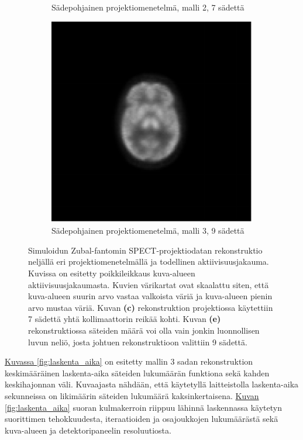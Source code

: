 \begin{figure}[H]
\begin{subfigure}[b]{.25\textwidth}
        \caption{Sädepohjainen projektiomenetelmä, malli 2, 7 sädettä}
    \end{subfigure}%
    \hspace{.075\textwidth}%
    \begin{subfigure}[b]{.25\textwidth}
        \includegraphics[width=\linewidth]{kuvat/cbf_rekonstruktio_proj1_malli3_nRay9.pdf}
        \caption{Sädepohjainen projektiomenetelmä, malli 3, 9 sädettä}
    \end{subfigure}
    \caption{Simuloidun Zubal-fantomin SPECT-projektiodatan rekonstruktio neljällä eri projektiomenetelmällä ja todellinen aktiivisuusjakauma. Kuvissa on esitetty poikkileikkaus kuva-alueen aktiivisuusjakaumasta. Kuvien värikartat ovat skaalattu siten, että kuva-alueen suurin arvo vastaa valkoista väriä ja kuva-alueen pienin arvo mustaa väriä. Kuvan \textbf{(c)} rekonstruktion projektiossa käytettiin 7 sädettä yhtä kollimaattorin reikää kohti. Kuvan \textbf{(e)} rekonstruktiossa säteiden määrä voi olla vain jonkin luonnollisen luvun neliö, josta johtuen rekonstruktioon valittiin 9 sädettä.}
    \label{fig:cbf-rekonstruktiot}
\end{figure}

\hyperref[fig:laskenta_aika]{Kuvassa \ref*{fig:laskenta_aika}} on esitetty mallin 3 sadan rekonstruktion keskimääräinen laskenta-aika säteiden lukumäärän funktiona sekä kahden keskihajonnan väli. Kuvaajasta nähdään, että käytetyllä laitteistolla laskenta-aika sekunneissa on likimäärin säteiden lukumäärä kaksinkertaisena. \hyperref[fig:laskenta_aika]{Kuvan \ref*{fig:laskenta_aika}} suoran kulmakerroin riippuu lähinnä laskennassa käytetyn suorittimen tehokkuudesta, iteraatioiden ja osajoukkojen lukumäärästä sekä kuva-alueen ja detektoripaneelin resoluutiosta.

